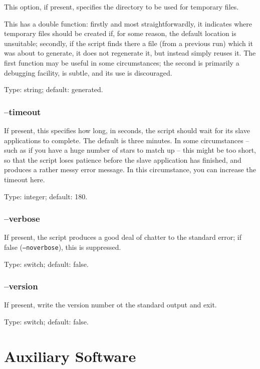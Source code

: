 \documentclass[twoside,11pt,nolof]{starlink}
\begin{document}
This option, if present, specifies the directory to be used for temporary
files.

This has a double function: firstly and most straightforwardly, it indicates
where temporary files should be created if, for some reason, the default
location is unsuitable; secondly, if the script finds there a file (from a
previous run) which it was about to generate, it does not regenerate it, but
instead simply reuses it.  The first function may be useful in some
circumstances; the second is primarily a debugging facility, is subtle, and
its use is discouraged.

Type: string; default: generated.

\subsubsection{--timeout\label{sb:options:timeout}}

If present, this specifies how long, in seconds, the script should wait for
its slave applications to complete.  The default is three minutes.  In some
circumstances -- such as if you have a huge number of stars to match up --
this might be too short, so that the script loses patience before the slave
application has finished, and produces a rather messy error message.  In this
circumstance, you can increase the timeout here.

Type: integer; default: 180.

\subsubsection{--verbose\label{sb:options:verbose}}

If present, the script produces a good deal of chatter to the standard error;
if false (\texttt{--noverbose}), this is suppressed.

Type: switch; default: false.

\subsubsection{--version\label{sb:options:version}}

If present, write the version number ot the standard output and exit.

Type: switch; default: false.

\section{Auxiliary Software\label{se:auxiliary}}
\end{document}

